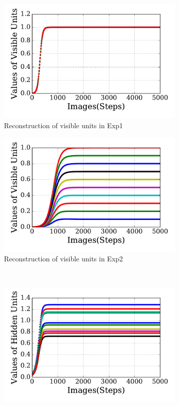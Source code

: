 \begin{figure}
\begin{subfigure}[t]{0.48\textwidth}
		\includegraphics[width=\textwidth]{pics_sdlm/20_exp_AE/exp1_recon_non.pdf}
		\caption{Reconstruction of visible units in Exp1}
	\end{subfigure}
	\begin{subfigure}[t]{0.48\textwidth}
		\includegraphics[width=\textwidth]{pics_sdlm/20_exp_AE/exp2_recon_non.pdf}
		\caption{Reconstruction of visible units in Exp2}
	\end{subfigure}\\
	\begin{subfigure}[t]{0.48\textwidth}
		\includegraphics[width=\textwidth]{pics_sdlm/20_exp_AE/exp1_hid_non.pdf}

\end{subfigure}
\end{figure}

